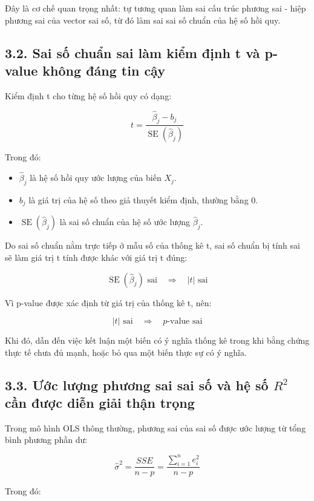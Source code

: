 \documentclass[12pt,a4paper]{article}
\begin{document}
Đây là cơ chế quan trọng nhất: tự tương quan làm sai cấu trúc phương sai
- hiệp phương sai của vector sai số, từ đó làm sai sai số chuẩn của hệ
số hồi quy.

\subsection{3.2. Sai số chuẩn sai làm kiểm định t và p-value không đáng tin cậy}

Kiểm định t cho từng hệ số hồi quy có dạng:

\[
t
=
\frac{\hat{\beta}_j-b_j}
{\operatorname{SE}(\hat{\beta}_j)}
\]

Trong đó:

\begin{itemize}
    \item $\hat{\beta}_j$ là hệ số hồi quy ước lượng của biến $X_j$.
    
    \item $b_j$ là giá trị của hệ số theo giả thuyết kiểm định, thường bằng 0.
    
    \item $\operatorname{SE}(\hat{\beta}_j)$ là sai số chuẩn của hệ số ước lượng $\hat{\beta}_j$.
\end{itemize}

Do sai số chuẩn nằm trực tiếp ở mẫu số của thống kê t, sai số chuẩn bị tính sai sẽ làm giá trị t tính được khác với giá trị t đúng:

\[
\widehat{\operatorname{SE}}(\hat{\beta}_j)
\text{ sai}
\quad \Rightarrow \quad
|t|
\text{ sai}
\]

Vì p-value được xác định từ giá trị của thống kê t, nên:

\[
|t|
\text{ sai}
\quad \Rightarrow \quad
p\text{-value sai}
\]

Khi đó, dẫn đến việc kết luận một biến có ý nghĩa thống kê trong khi bằng chứng thực tế chưa đủ mạnh, hoặc bỏ qua một biến thực sự có ý nghĩa.


\subsection{3.3. Ước lượng phương sai sai số và hệ số $R^2$ cần được diễn giải thận trọng}

Trong mô hình OLS thông thường, phương sai của sai số được ước lượng từ tổng bình phương phần dư:

\[
\hat{\sigma}^2
=
\frac{SSE}{n-p}
=
\frac{\sum_{i=1}^{n}e_i^2}{n-p}
\]

Trong đó:
\end{document}
